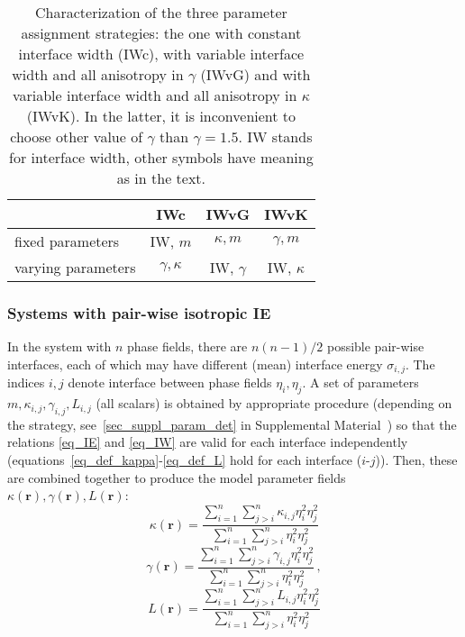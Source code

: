 \begin{table}[h]
	\centering
	\caption{Characterization of the three parameter assignment strategies: the one with constant interface width (IWc), with variable interface width and all anisotropy in $\gamma$ (IWvG) and with variable interface width and all anisotropy in $\kappa$ (IWvK). In the latter, it is inconvenient to choose other value of $\gamma$ than $\gamma=1.5$. IW stands for interface width, other symbols have meaning as in the text.}
	\label{tab_models_comparison}
	\begin{tabular}{l|c|c|c|}\footnotesize
		& IWc & IWvG & IWvK \\ \hline
		fixed parameters & IW, $m$ & $\kappa, m$ & $\gamma, m$  \\
		varying parameters & $\gamma, \kappa$ & IW, $\gamma$ & IW, $\kappa$
	\end{tabular}
\end{table}

\subsubsection{Systems with pair-wise isotropic IE}
In the system with $n$ phase fields, there are $n(n-1)/2$ possible pair-wise interfaces, each of which may have different (mean) interface energy $\sigma_{i,j}$. The indices $i,j$ denote interface between phase fields $\eta_i,\eta_j$. A set of parameters $m,\kappa_{i,j},\gamma_{i,j}, L_{i,j}$ (all scalars) is obtained by appropriate procedure  (depending on the strategy, see~\ref{sec_suppl_param_det} in Supplemental Material~\cite{Minar2021suppl}) so that the relations \eqref{eq_IE} and \eqref{eq_IW} are valid for each interface independently (equations~\eqref{eq_def_kappa}-\eqref{eq_def_L} hold for each interface ($i$-$j$)). Then, these are combined together to produce the model parameter fields $\kappa(\bm{r}),\gamma(\bm{r}),L(\bm{r})$:
\begin{equation}
	\kappa(\bm{r}) = \frac{\sum_{i=1}^n\sum_{j>i}^n\kappa_{i,j}\eta_i^2\eta_j^2}{\sum_{i=1}^n\sum_{j>i}^n\eta_i^2\eta_j^2}
\end{equation}
\begin{equation}
	\gamma(\bm{r}) = \frac{\sum_{i=1}^n\sum_{j>i}^n\gamma_{i,j}\eta_i^2\eta_j^2}{\sum_{i=1}^n\sum_{j>i}^n\eta_i^2\eta_j^2} \,,
\end{equation}
\begin{equation}
	L(\bm{r})= \frac{\sum_{i=1}^n\sum_{j>i}^nL_{i,j}\eta_i^2\eta_j^2}{\sum_{i=1}^n\sum_{j>i}^n\eta_i^2\eta_j^2}
\end{equation}

